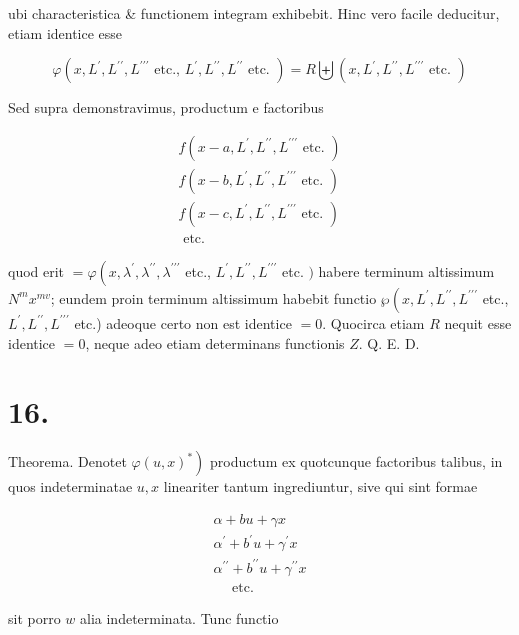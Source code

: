 \documentclass[twoside,12pt, showframe]{memoir}
\begin{document}
ubi characteristica \& functionem integram exhibebit. Hinc vero facile deducitur, etiam identice esse

\[
\varphi\left(x, L^{\prime}, L^{\prime \prime}, L^{\prime \prime \prime} \text { etc., } L^{\prime}, L^{\prime \prime}, L^{\prime \prime} \text { etc. }\right)=R \biguplus\left(x, L^{\prime}, L^{\prime \prime}, L^{\prime \prime \prime} \text { etc. }\right)
\]

Sed supra demonstravimus, productum e factoribus

\[
\begin{gathered}
f\left(x-a, L^{\prime}, L^{\prime \prime}, L^{\prime \prime \prime} \text { etc. }\right) \\
f\left(x-b, L^{\prime}, L^{\prime \prime}, L^{\prime \prime \prime} \text { etc. }\right) \\
f\left(x-c, L^{\prime}, L^{\prime \prime}, L^{\prime \prime \prime} \text { etc. }\right) \\
\text { etc. }
\end{gathered}
\]

quod erit \(=\varphi\left(x, \lambda^{\prime}, \lambda^{\prime \prime}, \lambda^{\prime \prime \prime}\right.\) etc., \(L^{\prime}, L^{\prime \prime}, L^{\prime \prime \prime}\) etc. \()\) habere terminum altissimum \(N^{m} x^{m v}\); eundem proin terminum altissimum habebit functio \(\wp\left(x, L^{\prime}, L^{\prime \prime}, L^{\prime \prime \prime}\right.\) etc., \(L^{\prime}, L^{\prime \prime}, L^{\prime \prime \prime}\) etc.) adeoque certo non est identice \(=0\). Quocirca etiam \(R\) nequit esse identice \(=0\), neque adeo etiam determinans functionis \(Z\). Q. E. D.

\section*{16.}
Theorema. Denotet \(\left.\varphi(u, x)^{*}\right)\) productum ex quotcunque factoribus talibus, in quos indeterminatae \(u, x\) lineariter tantum ingrediuntur, sive qui sint formae

\[
\begin{gathered}
\alpha+b u+\gamma x \\
\alpha^{\prime}+b^{\prime} u+\gamma^{\prime} x \\
\alpha^{\prime \prime}+b^{\prime \prime} u+\gamma^{\prime \prime} x \\
\quad \text { etc. }
\end{gathered}
\]

sit porro \(w\) alia indeterminata. Tunc functio
\end{document}
